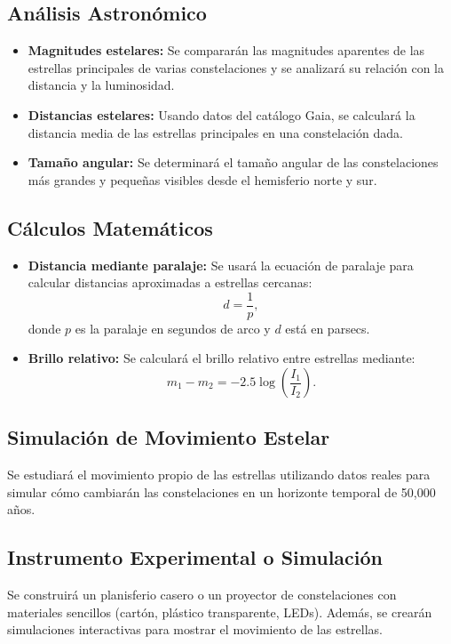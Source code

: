 \documentclass[12pt]{article}
\begin{document}
\subsection*{An\'alisis Astron\'omico}
\begin{itemize}
    \item \textbf{Magnitudes estelares:} Se comparar\'an las magnitudes aparentes de las estrellas principales de varias constelaciones y se analizar\'a su relaci\'on con la distancia y la luminosidad.
    \item \textbf{Distancias estelares:} Usando datos del cat\'alogo Gaia, se calcular\'a la distancia media de las estrellas principales en una constelaci\'on dada.
    \item \textbf{Tama\~no angular:} Se determinar\'a el tama\~no angular de las constelaciones m\'as grandes y peque\~nas visibles desde el hemisferio norte y sur.
\end{itemize}

\subsection*{C\'alculos Matem\'aticos}
\begin{itemize}
    \item \textbf{Distancia mediante paralaje:} Se usar\'a la ecuaci\'on de paralaje para calcular distancias aproximadas a estrellas cercanas:
    \begin{equation}
        d = \frac{1}{p},
    \end{equation}
    donde $p$ es la paralaje en segundos de arco y $d$ est\'a en parsecs.
    \item \textbf{Brillo relativo:} Se calcular\'a el brillo relativo entre estrellas mediante:
    \begin{equation}
        m_1 - m_2 = -2.5 \log \left(\frac{I_1}{I_2}\right).
    \end{equation}
\end{itemize}

\subsection*{Simulaci\'on de Movimiento Estelar}
Se estudiar\'a el movimiento propio de las estrellas utilizando datos reales para simular c\'omo cambiar\'an las constelaciones en un horizonte temporal de 50,000 a\~nos.

\subsection*{Instrumento Experimental o Simulaci\'on}
Se construir\'a un planisferio casero o un proyector de constelaciones con materiales sencillos (cart\'on, pl\'astico transparente, LEDs). Adem\'as, se crear\'an simulaciones interactivas para mostrar el movimiento de las estrellas.
\end{document}
